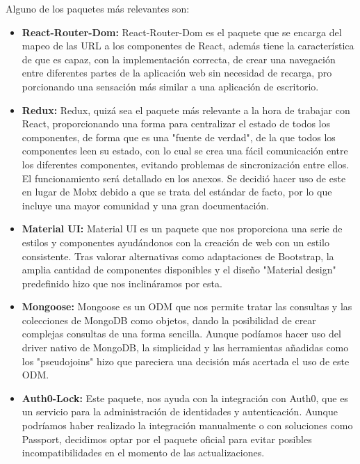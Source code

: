 Alguno de los paquetes más relevantes son:
\begin{itemize}
  \item \textbf{React-Router-Dom:} React-Router-Dom es el paquete que se encarga del mapeo de las URL a los componentes de React, además tiene la característica de que es capaz, con la implementación correcta, de crear una navegación entre diferentes partes de la aplicación web sin necesidad de recarga, pro
porcionando una sensación más similar a una aplicación de escritorio.

  \item \textbf{Redux:} Redux, quizá sea el paquete más relevante a la hora de trabajar con React, proporcionando una forma para centralizar el estado de todos los componentes, de forma que es una "fuente de verdad", de la que todos los componentes leen su estado, con lo cual se crea una fácil comunicación entre los diferentes componentes, evitando problemas de sincronización entre ellos. El funcionamiento será detallado en los anexos. Se decidió hacer uso de este en lugar de Mobx debido a que se trata del estándar de facto, por lo que incluye una mayor comunidad y una gran documentación.
  
  \item \textbf{Material UI:} Material UI es un paquete que nos proporciona una serie de estilos y componentes ayudándonos con la creación de web con un estilo consistente. Tras valorar alternativas como adaptaciones de Bootstrap, la amplia cantidad de componentes disponibles y el diseño "Material design" predefinido hizo que nos inclináramos por esta.
  
  \item \textbf{Mongoose:} Mongoose es un ODM que nos permite tratar las consultas y las colecciones de MongoDB como objetos, dando la posibilidad de crear complejas consultas de una forma sencilla. Aunque podíamos hacer uso del driver nativo de MongoDB, la simplicidad y las herramientas añadidas como los "pseudojoins" hizo que pareciera una decisión más acertada el uso de este ODM.
  
  \item \textbf{Auth0-Lock:} Este paquete, nos ayuda con la integración con Auth0, que es un servicio para la administración de identidades y autenticación. Aunque podríamos haber realizado la integración manualmente o con soluciones como Passport, decidimos optar por el paquete oficial para evitar posibles incompatibilidades en el momento de las actualizaciones.
  
\end{itemize}
